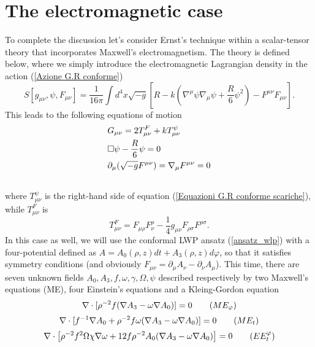 \section{The electromagnetic case} \label{tecnica con elettromagnetismo}
To complete the discussion let's consider Ernst's technique within a scalar-tensor theory that incorporates Maxwell's electromagnetism. The theory is defined below, where we simply introduce the electromagnetic Lagrangian density in the action (\ref{Azione G.R conforme})
\begin{equation}
    S[g_{\mu \nu}, \psi, F_{\mu \nu}] = \frac{1}{16\pi} \int d^4x \sqrt{-g} \left[ R - k\left( \nabla^{\mu}\psi \nabla_{\mu}\psi  + \frac{R}{6}\psi^2\right) -F^{\mu\nu}F_{\mu\nu}\right].
    \label{Azione G.R conforme elettromagnetica}
\end{equation}
This leads to the following equations of motion
\begin{align}
    &G_{\mu \nu} = 2T^{F}_{\mu \nu}+ kT^{\psi}_{\mu \nu}\notag\\
    &\Box \psi -\frac{R}{6}\psi= 0 \\
    & \partial_{\mu}(\sqrt{-g}F^{\mu \nu})=\nabla_{\mu}F^{\mu \nu}=0\notag\\\notag
    \label{equazioni GR conforme cariche}
\end{align}
where $T^{\psi}_{\mu \nu}$ is the right-hand side of equation (\ref{Equazioni G.R conforme scariche}), while $T^F_{\mu \nu}$ is
\begin{equation}
    T^F_{\mu \nu} = F_{\mu\rho}F^{\rho}_{\nu}-\frac{1}{4}g_{\mu \nu}F_{\rho\sigma}F^{\rho\sigma}.
\end{equation}
In this case as well, we will use the conformal LWP ansatz (\ref{ansatz_wlp}) with a four-potential defined as $A=A_0(\rho,z) dt + A_3(\rho,z) d\varphi$, so that it satisfies symmetry conditions (and obviously $F_{\mu \nu}= \partial_{\mu}A_{\nu}-\partial_{\nu}A_{\mu}$). This time, there are seven unknown fields $A_0, A_3, f, \omega, \gamma, \Omega, \psi$ described respectively by two Maxwell's equations (ME), four Einstein's equations and a Kleing-Gordon equation
\begin{equation}
    \nabla\cdot[\rho^{-2}f(\nabla A_3-\omega\nabla A_0)]=0 \tag{$ME_{\varphi}$}
\end{equation}
\begin{equation}
    \nabla\cdot[f^{-1}\nabla A_0 + \rho^{-2}f\omega(\nabla A_3-\omega\nabla A_0)]=0 \tag{$ME_{t}$}
\end{equation}
\begin{equation}
        \nabla\cdot \left[\rho^{-2}f^2\Omega\chi\nabla \omega +12f\rho^{-2}A_0(\nabla A_3-\omega\nabla A_0) \right] = 0\tag{$EE^{\varphi}_t$}
\end{equation}
